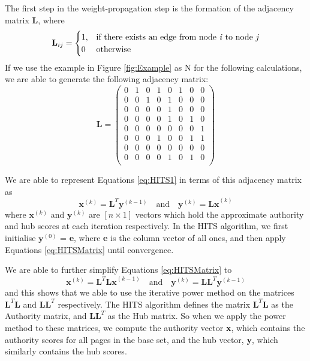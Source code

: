 \documentclass[11pt]{report}
\begin{document}
The first step in the weight-propagation step is the formation of the adjacency matrix \textbf{L}, where \[\textbf{L}_{ij} = \begin{cases} 1, & \textnormal{if there exists an edge from node \textit{i} to node \textit{j}}\\ 0 & \textnormal{otherwise}
\end{cases}\]
If we use the example in Figure \ref{fig:Example} as N for the following calculations, we are able to generate the following adjacency matrix:
\begin{equation*}
\textbf{L}=\left(
\begin{array}{cccccccc}
0 & 1 & 0 & 1 & 0 & 1 & 0 & 0 \\
0 & 0 & 1 & 0 & 1 & 0 & 0 & 0 \\
0 & 0 & 0 & 0 & 1 & 0 & 0 & 0 \\
0 & 0 & 0 & 0 & 1 & 0 & 1 & 0 \\
0 & 0 & 0 & 0 & 0 & 0 & 0 & 1 \\
0 & 0 & 0 & 1 & 0 & 0 & 1 & 1 \\
0 & 0 & 0 & 0 & 0 & 0 & 0 & 0 \\
0 & 0 & 0 & 0 & 1 & 0 & 1 & 0 \\
\end{array}
\right)
\end{equation*} 

We are able to represent Equations \eqref{eq:HITS1} in terms of this adjacency matrix as \begin{equation} \label{eq:HITSMatrix}
\textbf{x}^{(k)} = \textbf{L}^T\textbf{y}^{(k-1)}\quad\mathrm{and}\quad \textbf{y}^{(k)}=\textbf{Lx}^{(k)}
\end{equation} where \(\textbf{x}^{(k)}\) and \(\textbf{y}^{(k)}\) are $[\textit{n}\times 1]$ vectors which hold the approximate authority and hub scores at each iteration respectively. In the HITS algorithm, we first initialise $\textbf{y}^{(0)}$ = \textbf{e}, where \textbf{e} is the column vector of all ones, and then apply Equations \eqref{eq:HITSMatrix} until convergence. 

We are able to further simplify Equations \eqref{eq:HITSMatrix} to \begin{equation} \label{eq:HITSSimplify}
\textbf{x}^{(k)} = \textbf{L}^T\textbf{Lx}^{(k-1)}\quad\mathrm{and}\quad \textbf{y}^{(k)}=\textbf{LL}^T\textbf{y}^{(k-1)}
\end{equation} and this shows that we able to use the iterative power method on the matrices $\textbf{L}^T\textbf{L}$ and $\textbf{LL}^T$ respectively. The HITS algorithm defines the matrix $\textbf{L}^T\textbf{L}$ as the Authority matrix, and $\textbf{LL}^T$ as the Hub matrix. So when we apply the power method to these matrices, we compute the authority vector \textbf{x}, which contains the authority scores for all pages in the base set, and the hub vector, \textbf{y}, which similarly contains the hub scores.
\end{document}
